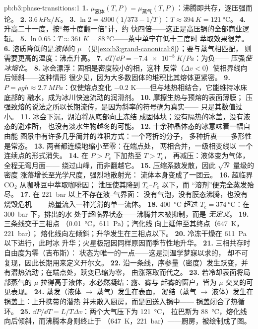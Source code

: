 \begin{solution}{pb:b3:phase-transitions:1}
\textbf{1.} $\mu_{\text{液体}}(T, P) = \mu_{\text{蒸气}}(T,
P)$：沸腾即共存，逐压强而论。
\textbf{2.} $\qty{3.6}{kPa/K}$。
\textbf{3.} $\ln2 = 4900(1/373 - 1/T)$：$T \approx \qty{394}{K} =
\qty{121}{\celsius}$。
\textbf{4.} 升高二十一度，按“每十度翻一倍”计，约
快四倍——这正是高压锅的全部商业逻辑。
\textbf{5.} $\ln0.65$：$T \approx \qty{361}{K} =
\qty{88}{\celsius}$——茶中单宁在低十二度时
萃取效果很差。
\textbf{6.} 溶质降低的是\emph{液体}的 $\mu$
（见\cref{exo:b3:grand-canonical:8}）；要与蒸气相匹配，
则需要更高的温度：沸点升高。
\textbf{7.} $\dd T/\dd P = \qty{-7.4e-8}{K/Pa}$：为负——
压强\emph{使冰熔化}。
\textbf{8.} 冰会漂浮：固相是密度较小的相，这种
反常（$\Delta v < 0$）使相界线向后倾斜——这种情形
很少见，因为大多数固体的堆积比其熔体更紧密。
\textbf{9.} $P = \rho gh \approx \qty{2.7}{MPa}$：仅使熔点变化
$-0.2$ K——但与地热相结合，它能维持冰床底部的
融水，成为冰川快速流动的润滑剂。
\textbf{10.} 摩擦生热与预熔的表面薄膜；
压强致熔的说法之所以长期流传，是因为斜率的符号确为真实——
只是其数值过小。
\textbf{11.} 冰会下沉，湖泊将从底部向上冻结
成固体块；没有隔热的冰盖，没有液态的避难所，
也没有淡水生物越冬的可能。
\textbf{12.} 十余种晶体态的冰意味着一幅自由能
图景中有许多几乎简并的堆积方式：一个弯折的分子，
多种折衷——多形性是常态。
\textbf{13.} 两者都连续地缩小至零：在端点处，
两相合并，一级相变线以
一个连续点的形式消失。
\textbf{14.} 在 $P > P_{\text{c}}$ 下加热至 $T > T_{\text{c}}$，
再减压：液体变为气体，全程无弯月面——
绕过山峰，而非翻越它。
\textbf{15.} 压缩系数发散，因此 $\sqrt N$ 量级的密度
涨落增长至光学尺度，强烈地散射光：
流体本身变成了一团云。
\textbf{16.} 超临界 CO$_2$ 从咖啡豆中萃取咖啡因；
泄压使其降到 $T_{\text{c}}$--$P_{\text{c}}$ 以下，而
“溶剂”便完全蒸发殆尽。
\textbf{17.} 在 \qty{221}{bar} 以上不存在液–气界面：
没有气泡，没有膜态沸腾，也没有烧毁危机——
热量流入一种光滑的单一流体。
\textbf{18.} \qty{400}{\celsius} 超过 $T_{\text{c}} =
\qty{374}{\celsius}$：在 \qty{300}{bar} 下，排出的水
处于超临界状态——沸腾并未被抑制，而是
\emph{无定义}。
\textbf{19.} 三条线交于三相点
（\qty{0.01}{\celsius}，\qty{611}{Pa}）；汽化线
向上延伸至其终点（\qty{647}{K}，\qty{221}{bar}）；
熔化线向左倾斜；升华发生在三相点以下。
\textbf{20.} 冷冻干燥在 \qty{611}{Pa} 以下进行，此时冰
升华；火星极冠因同样原因而季节性地升华。
\textbf{21.} 三相共存时自由度为零（吉布斯）：
状态为唯一的一点——这是测温学梦寐以求的，
却不可复现，因此长期用来定义开尔文。
\textbf{22.} 沿一条线，序参量（密度）发生跃变，并
有潜热流动；在端点处，跃变已缩为零，
由涨落取而代之。
\textbf{23.} 若冷却表面将局部蒸气的
$\mu$ 拉得高于液体，水必然凝结：露、雾与
起雾的窗户，皆为 $\mu$ 交叉的可见表现。
\textbf{24.} 蒸发（液体 $\to$ 蒸气）发生在表面，
凝结（蒸气 $\to$ 液体）发生在锅盖上：上升携带的潜热
并未散入厨房，而是回送入锅中——
锅盖闭合了热循环。
\textbf{25.} $\dd P/\dd T = L/T\Delta v$：两个大气压下为 \qty{121}{\celsius}，
拉巴斯为 \qty{88}{\celsius}，熔化线
向后倾斜，而沸腾本身则终止于
（\qty{647}{K}，\qty{221}{bar}）——厨房，被绘制成了图。
\end{solution}
